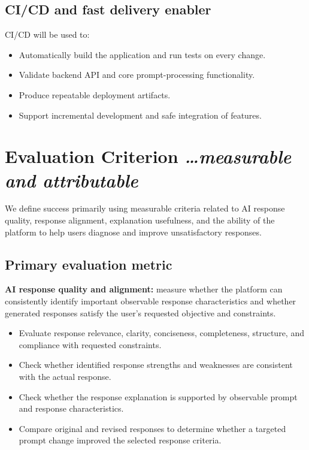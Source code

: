 \documentclass[11pt,a4paper]{article}
\newcommand{\BvrHint}[1]{%
  {\normalfont\normalsize\itshape\hfill #1}}
\begin{document}
\subsection{CI/CD and fast delivery enabler}

CI/CD will be used to:

\begin{itemize}[leftmargin=0.7cm]
    \item Automatically build the application and run tests on every change.
    \item Validate backend API and core prompt-processing functionality.
    \item Produce repeatable deployment artifacts.
    \item Support incremental development and safe integration of features.
\end{itemize}

\section{Evaluation Criterion%
  \BvrHint{\ldots measurable and attributable}}

We define success primarily using measurable criteria related to AI
response quality, response alignment, explanation usefulness, and the
ability of the platform to help users diagnose and improve unsatisfactory
responses.

\subsection{Primary evaluation metric}

\textbf{AI response quality and alignment:} measure whether the platform
can consistently identify important observable response characteristics and
whether generated responses satisfy the user's requested objective and
constraints.

\begin{itemize}[leftmargin=0.7cm]
    \item Evaluate response relevance, clarity, conciseness, completeness,
    structure, and compliance with requested constraints.
    \item Check whether identified response strengths and weaknesses are
    consistent with the actual response.
    \item Check whether the response explanation is supported by observable
    prompt and response characteristics.
    \item Compare original and revised responses to determine whether a
    targeted prompt change improved the selected response criteria.
\end{itemize}
\end{document}
